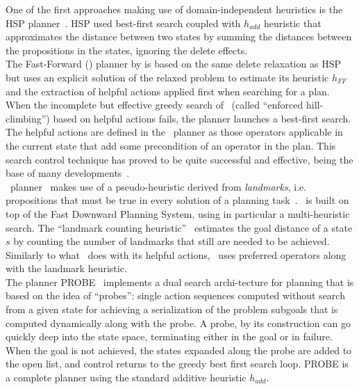 One of the first approaches making use of domain-independent heuristics is the HSP planner~\citep{bonet:hspr}. HSP used best-first search coupled with $h_{add}$ heuristic that approximates the distance between two states by summing the distances between the propositions in the states, ignoring the delete effects.\\
The Fast-Forward (\ff) planner by \citet{hoffmann:ff} is based on the same delete relaxation as HSP but uses an explicit solution of the relaxed problem to estimate its heuristic $h_{FF}$ and the extraction of helpful actions applied first when searching for a plan. 
When the  incomplete but effective greedy search of \ff \ (called ``enforced hill-climbing'') based on helpful actions fails, the planner launches a best-first search.
The helpful actions are defined in the \ff~planner as those operators applicable in the current state that add some precondition of an operator in the plan.
This search control technique has proved to
 be quite successful and effective, being the base of many developments~\citep{joerg:numeric,conformant-ff-journal,hoffmann:cont-ff}.\\
%
\lama~planner~\citep{richter:lama-jair} makes use of a pseudo-heuristic derived from \emph{landmarks}, 
i.e. propositions that must be true in every solution of a planning task~\citep{hoffmann:landmarks,porteous:landmarks}. 
\lama~is built on top of the Fast Downward Planning System, using in particular a multi-heuristic search. The ``landmark counting heuristic''~\citep{richter:lama}  estimates the goal distance of a state $s$ by counting the number of landmarks that still are needed to be achieved. Similarly to what \ff~does with its helpful actions, \lama~uses  preferred operators along with the landmark heuristic.\\
The planner PROBE~\citep{nir:probes} implements a dual search archi-tecture for planning that is based on the idea of ``probes'': single action sequences computed without search from a given state for achieving a serialization of the problem subgoals that is computed dynamically along with the probe. A probe, by its construction can go quickly deep into the state space, terminating either in the goal or in failure. When the goal is not achieved, the states expanded along the probe are added to the open list, and control returns to the greedy best first search loop. 
PROBE is a complete planner using the standard additive heuristic $h_{add}$. %



